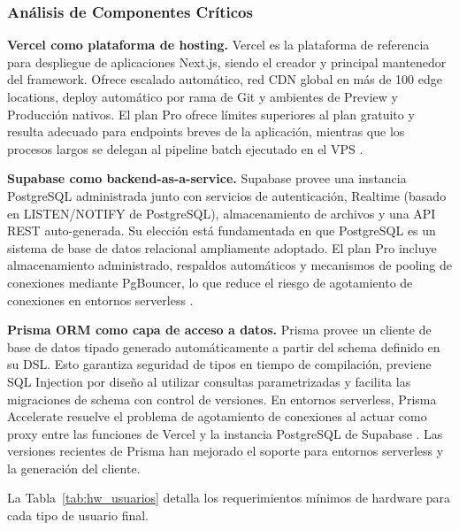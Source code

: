 \subsubsection{Análisis de Componentes Críticos}

\noindent\textbf{Vercel como plataforma de hosting.}
Vercel es la plataforma de referencia para despliegue de aplicaciones Next.js,
siendo el creador y principal mantenedor del framework. Ofrece escalado automático,
red CDN global en más de 100 edge locations, deploy automático por rama de Git y
ambientes de Preview y Producción nativos. El plan Pro ofrece límites superiores
al plan gratuito y resulta adecuado para endpoints breves de la aplicación, mientras
que los procesos largos se delegan al pipeline batch ejecutado en el VPS
\cite{vercel_pricing, nextjs}.

\noindent\textbf{Supabase como backend-as-a-service.}
Supabase provee una instancia PostgreSQL administrada junto con servicios de
autenticación, Realtime (basado en LISTEN/NOTIFY de PostgreSQL), almacenamiento
de archivos y una API REST auto-generada. Su elección está fundamentada en que
PostgreSQL es un sistema de base de datos relacional ampliamente adoptado.
El plan Pro incluye almacenamiento administrado, respaldos automáticos y
mecanismos de pooling de conexiones mediante PgBouncer, lo que reduce el riesgo de
agotamiento de conexiones en entornos serverless \cite{supabase_pricing}.

\noindent\textbf{Prisma ORM como capa de acceso a datos.}
Prisma provee un cliente de base de datos tipado generado automáticamente a partir
del schema definido en su DSL. Esto garantiza seguridad de tipos en tiempo de
compilación, previene SQL Injection por diseño al utilizar consultas parametrizadas
y facilita las migraciones de schema con control de versiones. En entornos
serverless, Prisma Accelerate resuelve el problema de agotamiento de conexiones
al actuar como proxy entre las funciones de Vercel y la instancia PostgreSQL
de Supabase \cite{prisma_docs, prisma_accelerate}. Las versiones recientes de Prisma han mejorado el soporte para
entornos serverless y la generación del cliente.

La Tabla~\ref{tab:hw_usuarios} detalla los requerimientos mínimos de hardware
para cada tipo de usuario final.

